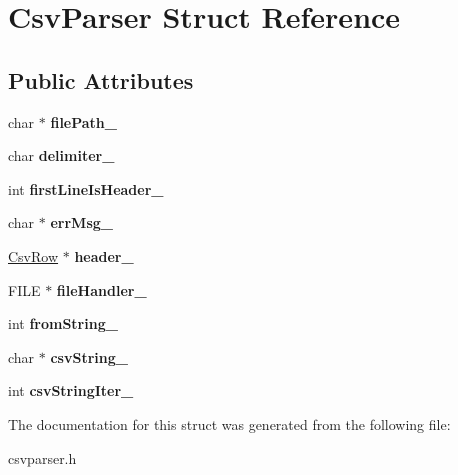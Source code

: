 \hypertarget{structCsvParser}{}\section{Csv\+Parser Struct Reference}
\label{structCsvParser}
\subsection*{Public Attributes}
\begin{DoxyCompactItemize}
\item 
\mbox{\label{structCsvParser_ab6554b8a9f6eb30ab3d70260978e2ba9}} 
char $\ast$ {\bfseries file\+Path\+\_\+}
\item 
\mbox{\label{structCsvParser_a2397568bbb5ba5c07f851b3d4912f90a}} 
char {\bfseries delimiter\+\_\+}
\item 
\mbox{\label{structCsvParser_a8ff87dcccef7bf07fc895d346cd06a0b}} 
int {\bfseries first\+Line\+Is\+Header\+\_\+}
\item 
\mbox{\label{structCsvParser_a94c89d1b1eee9cbbc27229e474fb64b7}} 
char $\ast$ {\bfseries err\+Msg\+\_\+}
\item 
\mbox{\label{structCsvParser_a874fa706960fbcc1ae2402e6431c31b8}} 
\mbox{\hyperlink{structCsvRow}{Csv\+Row}} $\ast$ {\bfseries header\+\_\+}
\item 
\mbox{\label{structCsvParser_a864123b6641654026eea1d8246f48f45}} 
F\+I\+LE $\ast$ {\bfseries file\+Handler\+\_\+}
\item 
\mbox{\label{structCsvParser_a945f8746ca5d78a43490d44cf3d8b11e}} 
int {\bfseries from\+String\+\_\+}
\item 
\mbox{\label{structCsvParser_acce5ca1892320db4dad5bdb8222b69bf}} 
char $\ast$ {\bfseries csv\+String\+\_\+}
\item 
\mbox{\label{structCsvParser_a7f7232b9244877392c4397245f8c55ba}} 
int {\bfseries csv\+String\+Iter\+\_\+}
\end{DoxyCompactItemize}


The documentation for this struct was generated from the following file\+:\begin{DoxyCompactItemize}
\item 
csvparser.\+h\end{DoxyCompactItemize}
